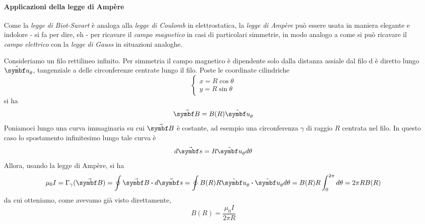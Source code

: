 \paragraph{Applicazioni della legge di Ampère}
Come la \textit{legge di Biot-Savart} è analoga alla \textit{legge di Coulomb} in elettrostatica, la \textit{legge di Ampère} può essere usata in maniera elegante e indolore - si fa per dire, eh - per ricavare il \textit{campo magnetico} in casi di particolari simmetrie, in modo analogo a come si può ricavare il \textit{campo elettrico} con la \textit{legge di Gauss} in situazioni analoghe.
\begin{examplewt}
	Consideriamo un filo rettilineo infinito. Per simmetria il campo magnetico è dipendente solo dalla distanza assiale dal filo d è diretto lungo $\vbh{u}_\theta$, tangenziale a delle circonferenze centrate lungo il filo. Poste le coordinate cilindriche
	\begin{equation*}
		\begin{cases}
			x=R\cos\theta\\
			y=R\sin\theta
		\end{cases}
	\end{equation*}
	si ha
	\begin{equation*}
		\vba{B}=B(R)\vbh{u}_\theta
	\end{equation*}
	Poniamoci lungo una curva immaginaria su cui $\vba{B}$ è costante, ad esempio una circonferenza $\gamma$ di raggio $R$ centrata nel filo. In questo caso lo spostamento infinitesimo lungo tale curva è
	\begin{equation*}
		d\vba{s}=R\vbh{u}_\theta d\theta
	\end{equation*}
	Allora, usando la legge di Ampère, si ha
	\begin{equation*}
		\mu_0I=\Gamma_{\gamma}(\vba{B})=\oint\vba{B}\vdot d\vba{s}=\oint B(R)R\vbh{u}_\theta\vdot\vbh{u}_{\theta}d\theta=B(R)R\int_{0}^{2\pi}d\theta=2\pi R B(R)
	\end{equation*}
	da cui otteniamo, come avevamo già visto direttamente,
	\begin{equation*}
		B(R)=\frac{\mu_0 I}{2\pi R}
	\end{equation*}
\end{examplewt}

